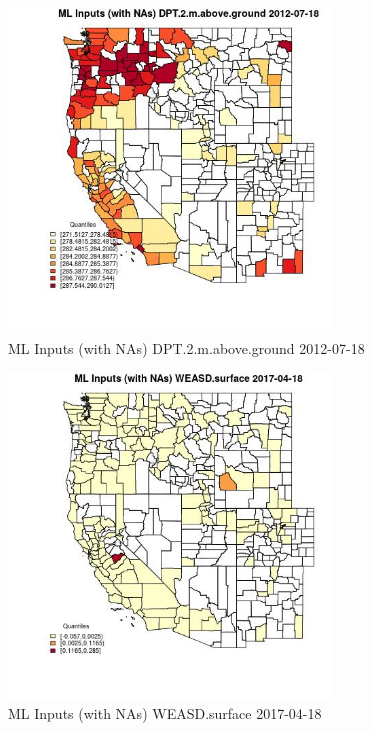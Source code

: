 \begin{figure} 
\centering  
\includegraphics[width=0.77\textwidth]{Code_Outputs/Report_ML_input_PM25_Step4_part_e_de_duplicated_aves_compiled_2019-05-14wNAs_CountyDPT2mabovegroundMean2012-07-18_2012-07-18.jpg} 
\caption{\label{fig:Report_ML_input_PM25_Step4_part_e_de_duplicated_aves_compiled_2019-05-14wNAsCountyDPT2mabovegroundMean2012-07-18_2012-07-18}ML Inputs (with NAs) DPT.2.m.above.ground 2012-07-18} 
\end{figure} 
 

\begin{figure} 
\centering  
\includegraphics[width=0.77\textwidth]{Code_Outputs/Report_ML_input_PM25_Step4_part_e_de_duplicated_aves_compiled_2019-05-14wNAs_CountyWEASDsurfaceMean2017-04-18_2017-04-18.jpg} 
\caption{\label{fig:Report_ML_input_PM25_Step4_part_e_de_duplicated_aves_compiled_2019-05-14wNAsCountyWEASDsurfaceMean2017-04-18_2017-04-18}ML Inputs (with NAs) WEASD.surface 2017-04-18} 
\end{figure} 
 

